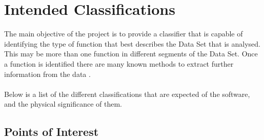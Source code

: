 \documentclass[main.tex]{subfiles}
\begin{document}
  
  \section{Intended Classifications}
  
    The main objective of the project is to provide a classifier that is capable of identifying the type of function that best describes the Data Set that is analysed. This may be more than one function in different segments of the Data Set. Once a function is identified there are many known methods to extract further information from the data \cite[Chapter~2]{numAnal}. 
    \\\\
    Below is a list of the different classifications that are expected of the software, and the physical significance of them.
    
    \subsection{Points of Interest}  
    \label{sec:POI}
    
\end{document}
